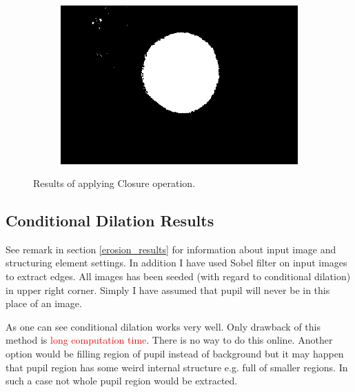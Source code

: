 \documentclass{article}
\begin{document}
\begin{figure}[H]
\begin{subfigure}{.09\textwidth}
  \label{fig:arrow}
\end{subfigure}%
\begin{subfigure}{.47\textwidth}
  \centering
  \includegraphics[width=0.97\linewidth]{_Figures/raw_data_4_closure.png}
  \caption{}
  \label{fig:raw_4_closure}
\end{subfigure}

\caption{Results of applying Closure operation. }
\label{fig:closure_results}
\end{figure}


%
%
\newpage
\subsection{Conditional Dilation Results}
See remark in section \ref{erosion_results} for information about input image and structuring element settings. In addition I have used Sobel filter on input images to extract edges. All images has been seeded (with regard to conditional dilation) in upper right corner. Simply I have assumed that pupil will never be in this place of an image.

As one can see conditional dilation works very well. Only drawback of this method is \textcolor{red}{long computation time}. There is no way to do this online. Another option would be filling region of pupil instead of background but it may happen that pupil region has some weird internal structure e.g. full of smaller regions. In such a case not whole pupil region would be extracted.
\end{document}
